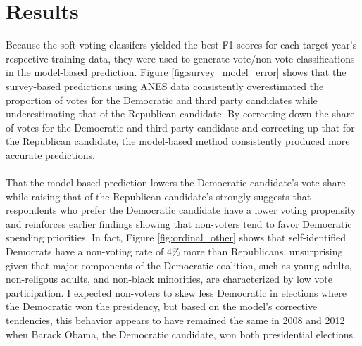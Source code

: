\documentclass{article}
\begin{document}
	\section{Results}
	
	Because the soft voting classifers yielded the best F1-scores for each target year's respective training data, they were used to generate vote/non-vote classifications in the model-based prediction. Figure \ref{fig:survey_model_error} shows that the survey-based predictions using ANES data consistently overestimated the proportion of votes for the Democratic and third party candidates while underestimating that of the Republican candidate. By correcting down the share of votes for the Democratic and third party candidate and correcting up that for the Republican candidate, the model-based method consistently produced more accurate predictions.
	\\\\
	That the model-based prediction lowers the Democratic candidate's vote share while raising that of the Republican candidate's strongly suggests that respondents who prefer the Democratic candidate have a lower voting propensity and reinforces earlier findings showing that non-voters tend to favor Democratic spending priorities. In fact, Figure \ref{fig:ordinal_other} shows that self-identified Democrats have a non-voting rate of 4\% more than Republicans, unsurprising given that major components of the Democratic coalition, such as young adults, non-religous adults, and non-black minorities, are characterized by low vote participation. I expected non-voters to skew less Democratic in elections where the Democratic won the presidency, but based on the model's corrective tendencies, this behavior appears to have remained the same in 2008 and 2012 when Barack Obama, the Democratic candidate, won both presidential elections.\\
\end{document}
